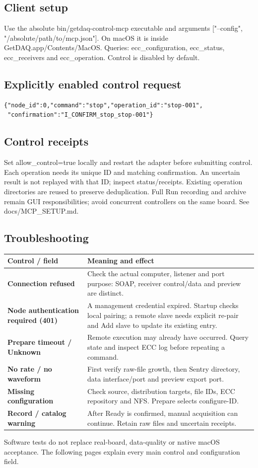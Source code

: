 \documentclass[11pt,a4paper]{article}
\newcommand{\ui}[1]{\textbf{#1}}
\newcommand{\note}[1]{\begin{tcolorbox}[colback=light,colframe=accent!40,boxrule=0.5pt,arc=2mm,left=8pt,right=8pt,top=5pt,bottom=5pt]#1\end{tcolorbox}}
\begin{document}
\subsection*{Client setup}
Use the absolute bin/getdaq-control-mcp executable and arguments ["--config", "/absolute/path/to/mcp.json"]. On macOS it is inside GetDAQ.app/Contents/MacOS. Queries: ecc\_configuration, ecc\_status, ecc\_receivers and ecc\_operation. Control is disabled by default.

\subsection*{Explicitly enabled control request}
\begin{verbatim}
{"node_id":0,"command":"stop","operation_id":"stop-001",
 "confirmation":"I_CONFIRM_stop_stop-001"}
\end{verbatim}
\subsection*{Control receipts}
Set allow\_control=true locally and restart the adapter before submitting control. Each operation needs its unique ID and matching confirmation. An uncertain result is not replayed with that ID; inspect status/receipts. Existing operation directories are reused to preserve deduplication. Full Run recording and archive remain GUI responsibilities; avoid concurrent controllers on the same board. See docs/MCP\_SETUP.md.

\subsection*{Troubleshooting}
\begin{tabularx}{\linewidth}{@{}L{58mm}Y@{}}\toprule
Control / field & Meaning and effect \\\midrule
\ui{Connection refused} & Check the actual computer, listener and port purpose: SOAP, receiver control/data and preview are distinct.\\
\ui{Node authentication required (401)} & A management credential expired. Startup checks local pairing; a remote slave needs explicit re-pair and Add slave to update its existing entry.\\
\ui{Prepare timeout / Unknown} & Remote execution may already have occurred. Query state and inspect ECC log before repeating a command.\\
\ui{No rate / no waveform} & First verify raw-file growth, then Sentry directory, data interface/port and preview export port.\\
\ui{Missing configuration} & Check source, distribution targets, file IDs, ECC repository and NFS. Prepare selects configure-ID.\\
\ui{Record / catalog warning} & After Ready is confirmed, manual acquisition can continue. Retain raw files and uncertain receipts.\\
\bottomrule\end{tabularx}
\note{Software tests do not replace real-board, data-quality or native macOS acceptance. The following pages explain every main control and configuration field.}
\end{document}
